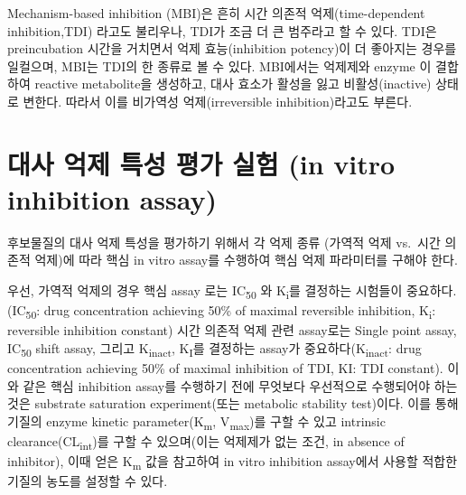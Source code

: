 \documentclass[
  11pt,
  krantz2, a4paper, twoside]{krantz}
\begin{document}
Mechanism-based inhibition (MBI)은 흔히 시간 의존적 억제(time-dependent
inhibition,TDI) 라고도 불리우나, TDI가 조금 더 큰 범주라고 할 수 있다.
TDI은 preincubation 시간을 거치면서 억제 효능(inhibition potency)이 더
좋아지는 경우를 일컬으며, MBI는 TDI의 한 종류로 볼 수 있다. MBI에서는
억제제와 enzyme 이 결합하여 reactive metabolite을 생성하고, 대사 효소가
활성을 잃고 비활성(inactive) 상태로 변한다. 따라서 이를 비가역성
억제(irreversible inhibition)라고도 부른다.

\section{대사 억제 특성 평가 실험 (in vitro inhibition assay)}\label{uxb300uxc0ac-uxc5b5uxc81c-uxd2b9uxc131-uxd3c9uxac00-uxc2e4uxd5d8-in-vitro-inhibition-assay}

후보물질의 대사 억제 특성을 평가하기 위해서 각 억제 종류 (가역적 억제
vs.~시간 의존적 억제)에 따라 핵심 in vitro assay를 수행하여 핵심 억제
파라미터를 구해야 한다.

우선, 가역적 억제의 경우 핵심 assay 로는 IC\textsubscript{50} 와 K\textsubscript{i}를 결정하는
시험들이 중요하다.(IC\textsubscript{50}: drug concentration achieving 50\% of maximal
reversible inhibition, K\textsubscript{i}: reversible inhibition constant) 시간 의존적
억제 관련 assay로는 Single point assay, IC\textsubscript{50} shift assay, 그리고
K\textsubscript{inact}, K\textsubscript{I}를 결정하는 assay가 중요하다(K\textsubscript{inact}: drug concentration
achieving 50\% of maximal inhibition of TDI, KI: TDI constant). 이와 같은
핵심 inhibition assay를 수행하기 전에 무엇보다 우선적으로 수행되어야
하는 것은 substrate saturation experiment(또는 metabolic stability
test)이다. 이를 통해 기질의 enzyme kinetic parameter(K\textsubscript{m}, V\textsubscript{max})를
구할 수 있고 intrinsic clearance(CL\textsubscript{int})를 구할 수 있으며(이는 억제제가
없는 조건, in absence of inhibitor), 이때 얻은 K\textsubscript{m} 값을 참고하여 in
vitro inhibition assay에서 사용할 적합한 기질의 농도를 설정할 수 있다.
\end{document}
